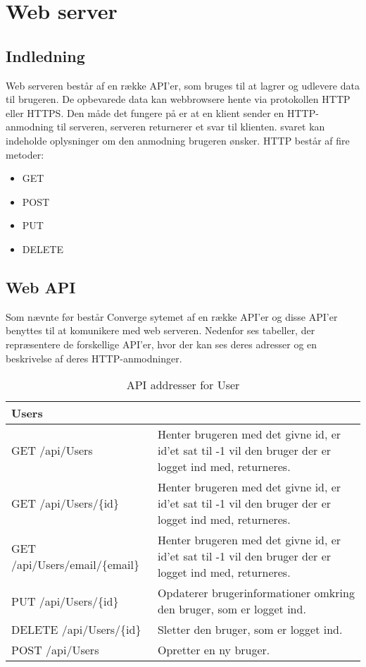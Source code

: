 \chapter{Web server}

\section{Indledning}
Web serveren består af en række API'er, som bruges til at lagrer og udlevere data til brugeren. De opbevarede data kan webbrowsere hente via protokollen HTTP eller HTTPS. Den måde det fungere på er at en klient sender en HTTP-anmodning til serveren, serveren returnerer et svar til klienten. svaret kan indeholde oplysninger om den anmodning brugeren ønsker. 
HTTP består af fire metoder:
 
\begin{itemize}
	\item GET
	\item POST
	\item PUT
	\item DELETE
  \end{itemize}

\section{Web API}
Som nævnte før består Converge sytemet af en række API'er og disse API'er benyttes til at komunikere med web serveren. Nedenfor ses tabeller, der repræsentere de forskellige API'er, hvor der kan ses deres adresser og en beskrivelse af deres HTTP-anmodninger.

\begin{table}[H]
	\centering
	\caption{API addresser for User}
	\label{tab:web_user}
	\begin{tabular}{p{5cm}|p{11cm}}
		\hline
		\multicolumn{2}{l}{\textbf{Users}}\\
		\hline
		GET \newline
		/api/Users &
		Henter brugeren med det givne id, er id'et sat til -1 vil den bruger der er logget ind med, returneres. \\
        \hline
        GET \newline
		/api/Users/\{id\} &
		Henter brugeren med det givne id, er id'et sat til -1 vil den bruger der er logget ind med, returneres. \\
        \hline
        GET \newline
		/api/Users/email/\{email\} &
		Henter brugeren med det givne id, er id'et sat til -1 vil den bruger der er logget ind med, returneres. \\
        \hline
		PUT \newline
		/api/Users/\{id\} &
		Opdaterer brugerinformationer omkring den bruger, som er logget ind. \\
		\hline
		DELETE \newline
		/api/Users/\{id\} &
		Sletter den bruger, som er logget ind. \\
		\hline
		POST \newline
		/api/Users &
		Opretter en ny bruger. \\
		\hline
	\end{tabular}
\end{table}

